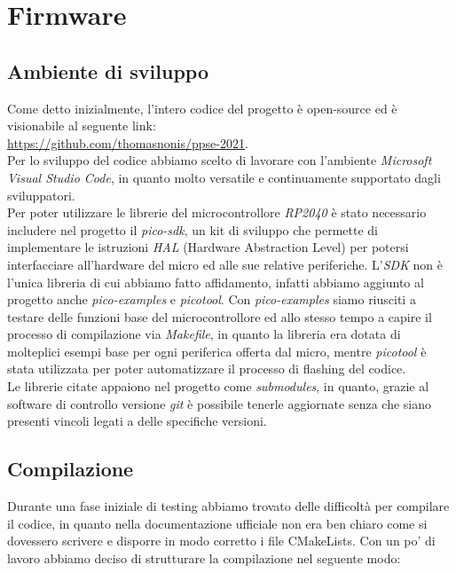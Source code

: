 \chapter{Firmware}

\hypertarget{ambiente-di-sviluppo}{%
\section{Ambiente di sviluppo}\label{ambiente-di-sviluppo}}

Come detto inizialmente, l'intero codice del progetto è open-source ed è
visionabile al seguente link:\\
\href{https://github.com/thomasnonis/ppse-2021}{\underline{https://github.com/thomasnonis/ppse-2021}}.\\
Per lo sviluppo del codice abbiamo scelto di lavorare con l'ambiente
\emph{Microsoft Visual Studio Code}, in quanto molto versatile e
continuamente supportato dagli sviluppatori.\\
Per poter utilizzare le librerie del microcontrollore \emph{RP2040} è
stato necessario includere nel progetto il \emph{pico-sdk}, un kit di
sviluppo che permette di implementare le istruzioni \emph{HAL} (Hardware
Abstraction Level) per potersi interfacciare all'hardware del micro ed
alle sue relative periferiche. L'\emph{SDK} non è l'unica libreria di
cui abbiamo fatto affidamento, infatti abbiamo aggiunto al progetto
anche \emph{pico-examples} e \emph{picotool}. Con \emph{pico-examples}
siamo riusciti a testare delle funzioni base del microcontrollore ed
allo stesso tempo a capire il processo di compilazione via
\emph{Makefile}, in quanto la libreria era dotata di molteplici esempi
base per ogni periferica offerta dal micro, mentre \emph{picotool} è
stata utilizzata per poter automatizzare il processo di flashing del
codice.\\
Le librerie citate appaiono nel progetto come \emph{submodules}, in
quanto, grazie al software di controllo versione \emph{git} è possibile
tenerle aggiornate senza che siano presenti vincoli legati a delle
specifiche versioni.

\hypertarget{compilazione}{%
\section{Compilazione}\label{compilazione}}

\noindent Durante una fase iniziale di testing abbiamo trovato delle difficoltà
per compilare il codice, in quanto nella documentazione ufficiale non
era ben chiaro come si dovessero scrivere e disporre in modo corretto i
file CMakeLists. Con un po' di lavoro abbiamo deciso di strutturare la
compilazione nel seguente modo:

